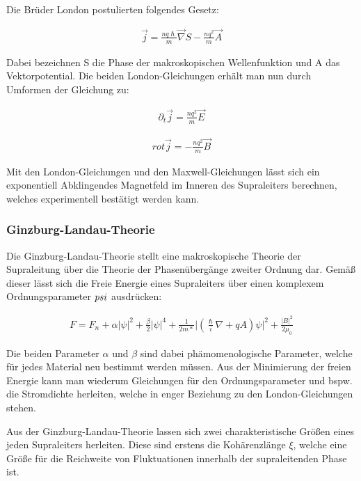 Die Brüder London postulierten folgendes Gesetz:

\begin{align}
\overrightarrow{j}=\frac{nq\hslash}{m}\overrightarrow{\nabla}S - \frac{nq^{2}}{m}\overrightarrow{A}
\end{align}

Dabei bezeichnen S die Phase der makroskopischen Wellenfunktion und A das Vektorpotential. Die beiden London-Gleichungen erhält man nun durch Umformen der Gleichung zu:

\begin{align}
\partial_t \overrightarrow{j}=\frac{nq^2}{m}\overrightarrow{E}
\end{align}

\begin{align}
rot \overrightarrow{j}=-\frac{nq^2}{m}\overrightarrow{B}
\end{align}

Mit den London-Gleichungen und den Maxwell-Gleichungen lässt sich ein exponentiell Abklingendes Magnetfeld im Inneren des Supraleiters berechnen, welches experimentell bestätigt werden kann. 


\subsubsection{Ginzburg-Landau-Theorie}\label{ginzburg}

Die Ginzburg-Landau-Theorie stellt eine makroskopische Theorie der Supraleitung über die Theorie der Phasenübergänge zweiter Ordnung dar. Gemäß dieser lässt sich die Freie Energie eines Supraleiters über einen komplexem Ordnungsparameter $\\psi$ ausdrücken:

\begin{align}
F=F_n + \alpha \vert\psi\vert^2 +\frac{\beta}{2}\vert\psi\vert^4+\frac{1}{2m*}\vert\left(\frac{\hslash}{i}\nabla +qA\right)\psi\vert^2 + \frac{\vert B \vert^2}{2\mu_0}
\end{align}

Die beiden Parameter $\alpha$ und $\beta$ sind dabei phämomenologische Parameter, welche für jedes Material neu bestimmt werden müssen. Aus der Minimierung der freien Energie kann man wiederum Gleichungen für den Ordnungsparameter und bspw. die Stromdichte herleiten, welche in enger Beziehung zu den London-Gleichungen stehen. 

Aus der Ginzburg-Landau-Theorie lassen sich zwei charakteristische Größen eines jeden Supraleiters herleiten. Diese sind erstens die Kohärenzlänge $\xi$, welche eine Größe für die Reichweite von Fluktuationen innerhalb der supraleitenden Phase ist.

